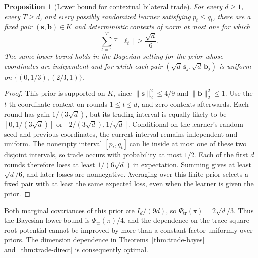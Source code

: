 \documentclass[11pt]{article}
\newtheorem{proposition}[theorem]{Proposition}
\newcommand{\E}[1]{\mathbb E\left[#1\right]}
\newcommand{\norm}[1]{\lVert #1\rVert_2}
\newcommand{\bs}{\boldsymbol s}
\newcommand{\bb}{\boldsymbol b}
\begin{document}
\begin{proposition}[Lower bound for contextual bilateral trade]\label{prop:trade-lb}
For every $d\ge1$, every $T\ge d$, and every possibly randomized learner satisfying $p_t\le q_t$, there are a fixed pair $(\boldsymbol s,\boldsymbol b)\in K$ and deterministic contexts of norm at most one for which
\[
 \sum_{t=1}^T\E{\ell_t}\ge\frac{\sqrt d}{6}.
\]
The same lower bound holds in the Bayesian setting for the prior whose coordinates are independent and for which each pair $(\sqrt d\,\bs_j,\sqrt d\,\bb_j)$ is uniform on $\{(0,1/3),(2/3,1)\}$.
\end{proposition}
\begin{proof}
This prior is supported on $K$, since $\norm{\bs}^2\le4/9$ and $\norm{\bb}^2\le1$. Use the $t$-th coordinate context on rounds $1\le t\le d$, and zero contexts afterwards. Each round has gain $1/(3\sqrt d)$, but its trading interval is equally likely to be $[0,1/(3\sqrt d)]$ or $[2/(3\sqrt d),1/\sqrt d]$. Conditional on the learner's random seed and previous coordinates, the current interval remains independent and uniform. The nonempty interval $[p_t,q_t]$ can lie inside at most one of these two disjoint intervals, so trade occurs with probability at most $1/2$. Each of the first $d$ rounds therefore loses at least $1/(6\sqrt d)$ in expectation. Summing gives at least $\sqrt d/6$, and later losses are nonnegative. Averaging over this finite prior selects a fixed pair with at least the same expected loss, even when the learner is given the prior.
\end{proof}

Both marginal covariances of this prior are $I_d/(9d)$, so $\Psi_{\mathrm{tr}}(\pi)=2\sqrt d/3$. Thus the Bayesian lower bound is $\Psi_{\mathrm{tr}}(\pi)/4$, and the dependence on the trace-square-root potential cannot be improved by more than a constant factor uniformly over priors. The dimension dependence in Theorems~\ref{thm:trade-bayes} and~\ref{thm:trade-direct} is consequently optimal.
\end{document}
